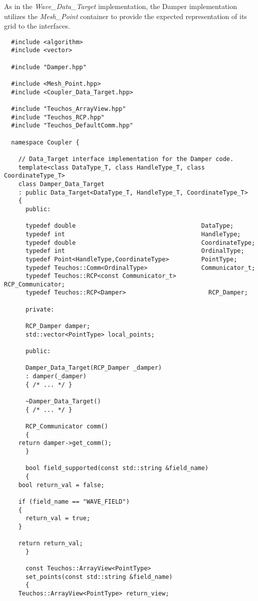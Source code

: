 \documentclass[letterpaper]{article}
\begin{document}
As in the {\sl Wave\_Data\_Target} implementation, the Damper
implementation utilizes the {\sl Mesh\_Point} container to provide the
expected representation of its grid to the interfaces.

\begin{lstlisting}
  #include <algorithm>
  #include <vector>

  #include "Damper.hpp"

  #include <Mesh_Point.hpp>
  #include <Coupler_Data_Target.hpp>

  #include "Teuchos_ArrayView.hpp"
  #include "Teuchos_RCP.hpp"
  #include "Teuchos_DefaultComm.hpp"

  namespace Coupler {

    // Data_Target interface implementation for the Damper code.
    template<class DataType_T, class HandleType_T, class CoordinateType_T>
    class Damper_Data_Target 
    : public Data_Target<DataType_T, HandleType_T, CoordinateType_T>
    {
      public:

      typedef double                                   DataType;
      typedef int                                      HandleType;
      typedef double                                   CoordinateType;
      typedef int                                      OrdinalType;
      typedef Point<HandleType,CoordinateType>         PointType;
      typedef Teuchos::Comm<OrdinalType>               Communicator_t;
      typedef Teuchos::RCP<const Communicator_t>       RCP_Communicator;
      typedef Teuchos::RCP<Damper>                       RCP_Damper;

      private:

      RCP_Damper damper;
      std::vector<PointType> local_points;

      public:

      Damper_Data_Target(RCP_Damper _damper)
      : damper(_damper)
      { /* ... */ }

      ~Damper_Data_Target()
      { /* ... */ }

      RCP_Communicator comm()
      {
	return damper->get_comm();
      }

      bool field_supported(const std::string &field_name)
      {
	bool return_val = false;

	if (field_name == "WAVE_FIELD")
	{
	  return_val = true;
	}

	return return_val;
      }

      const Teuchos::ArrayView<PointType> 
      set_points(const std::string &field_name)
      {
	Teuchos::ArrayView<PointType> return_view;


\end{lstlisting}
\end{document}
